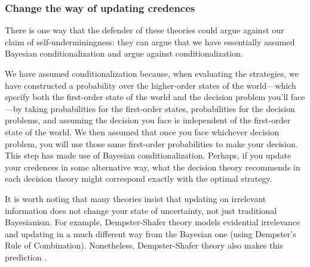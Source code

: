 \documentclass[a4paper]{article}
\newcommand{\todoinfo}[2][]{\todo[backgroundcolor=orange!80,bordercolor=black,linecolor=gray!80, #1,inline,caption={}]{#2}}
\renewcommand{\color}[1]{}
\newenvironment{CCM rewritten}
{\begingroup\color{blue}} %
{\endgroup}              %
\begin{document}

\subsubsection{Change the way of updating credences}


There is one way that the defender of these theories could argue against our claim of self-underminingness: they can argue that we have essentially assumed Bayesian conditionalization and argue against conditionalization. 

We have assumed conditionalization because, when evaluating the strategies, we have constructed a probability over the higher-order states of the world---which specify both the first-order state of the world and the decision problem you'll face---by taking probabilities for the first-order states, probabilities for the decision problems, and assuming the decision you face is independent of the first-order state of the world. 
We then assumed that once you face whichever decision problem, you will use those same first-order probabilities to make your decision. 
This step has made use of Bayesian conditionalization. 
Perhaps, if you update your credences in some alternative way, what the decision theory recommends in each decision theory might correspond exactly with the optimal strategy.


{ It is worth noting that many theories insist that updating on irrelevant information does not change your state of uncertainty, not just traditional Bayesianism. For example, Dempster-Shafer theory models evidential irrelevance and updating in a much different way from the Bayesian one (using Dempster’s Rule of Combination). Nonetheless, Dempster-Shafer theory also makes this prediction \cite[pp. 133-5]{weisberg2015uui}.}
\end{document}
